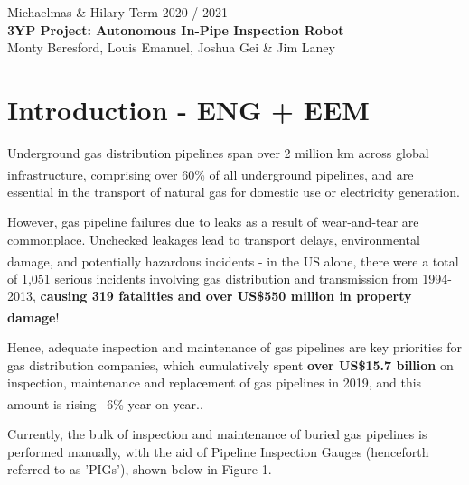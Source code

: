 \documentclass[11pt]{article}		%
\newcommand{\supercite}[1]{\textsuperscript{\cite{#1}}}		%
\begin{document}
	
	\flushleft
	\raggedright

	\begin{center}
		\vspace*{2cm}
		Michaelmas \& Hilary Term 2020 / 2021\\ %
		\vspace*{6cm}
		\huge{\textbf{3YP Project: Autonomous In-Pipe Inspection Robot}}\\ 
		\vspace*{6cm}
		\large{Monty Beresford, Louis Emanuel, Joshua Gei \& Jim Laney}
		\thispagestyle{empty} %
	\end{center}

	\newpage
	
	\tableofcontents
	\thispagestyle{empty} %
	\newpage

	\setcounter{page}{1}
	
	\section{Introduction - ENG + EEM}
Underground gas distribution pipelines span over 2 million km across global infrastructure\supercite{pct2020states}, comprising over 60\% of all underground pipelines\supercite{pct2020states}, and are essential in the transport of natural gas for domestic use or electricity generation. 

However, gas pipeline failures due to leaks as a result of wear-and-tear are commonplace. Unchecked leakages lead to transport delays, environmental damage, and potentially hazardous incidents\supercite{pct2020states} - in the US alone, there were a total of 1,051 serious incidents involving gas distribution and transmission from 1994-2013, \textbf{causing 319 fatalities and over US\$550 million in property damage}\supercite{pct2020states}!

Hence, adequate inspection and maintenance of gas pipelines are key priorities for gas distribution companies, which cumulatively spent \textbf{over US\$15.7 billion} on inspection, maintenance  and replacement of gas pipelines in 2019, and this amount is rising ~6\% year-on-year.\supercite{pct2020states}. 

Currently, the bulk of inspection and maintenance of buried gas pipelines is performed manually, with the aid of Pipeline Inspection Gauges (henceforth referred to as 'PIGs'), shown below in Figure 1. 
\end{document}
